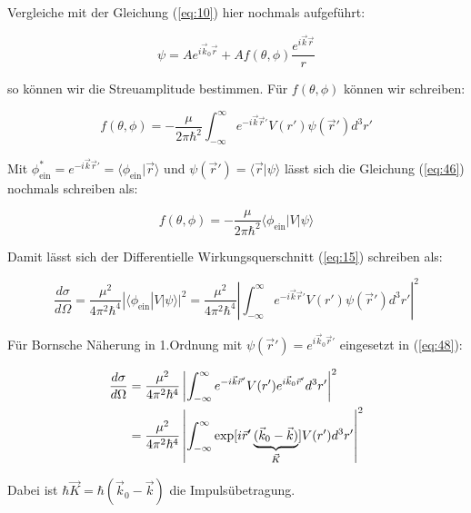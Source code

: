 Vergleiche mit der Gleichung (\ref{eq:10}) hier nochmals aufgeführt:

\begin{equation}
  \label{eq:45}
  \psi = A e^{i\vec k_{0}\vec r} + A f(\theta,\phi)\frac{e^{i\vec k\vec r}}{r} 
\end{equation}


so können wir die Streuamplitude bestimmen. Für \(f(\theta,\phi)\) können wir schreiben:

\begin{equation}
  \label{eq:46}
  \boxed{ f(\theta,\phi) = - \frac{\mu}{2\pi\hbar^2}\int_{-\infty}^\infty e^{- i\vec k\vec r' }  V(r') \psi(\vec r') d^3 r' }
\end{equation}

Mit \(\phi_{\text{ein}}^* =e^{- i\vec k\vec r' } = \langle\phi_{\text{ein}}|\vec r\rangle  \) und \(\psi(\vec r') = \langle \vec r| \psi\rangle \) lässt sich die Gleichung (\ref{eq:46}) nochmals schreiben als:

\begin{equation}
  \label{eq:47}
   \boxed{ f(\theta,\phi) = - \frac{\mu}{2\pi\hbar^2} \langle\phi_{\text{ein}}|  V |\psi\rangle }
\end{equation}


Damit lässt sich der Differentielle Wirkungsquerschnitt (\ref{eq:15})  schreiben als:

\begin{equation}
  \label{eq:48}
  \boxed{  \frac{d\sigma}{d\Omega}= \frac{\mu^2}{4\pi^2\hbar^4} |\langle\phi_{\text{ein}}|  V |\psi\rangle |^2 = \frac{\mu^2}{4\pi^2\hbar^4} \left| \int_{-\infty}^\infty e^{- i\vec k\vec r' }  V(r') \psi(\vec r') d^3 r' \right|^2  }
\end{equation}


Für Bornsche Näherung in 1.Ordnung mit \(\psi(\vec r') = e^{i\vec k_0\vec r'}\) eingesetzt in (\ref{eq:48}):

\begin{align}
  \label{eq:49}
  \frac{d\sigma}{d\Omega} &=  \frac{\mu^2}{4\pi^2\hbar^4} \left| \int_{-\infty}^\infty e^{- i\vec k\vec r' }  V(r')  e^{i\vec k_0\vec r'} d^3 r' \right|^2 \notag\\
&=  \frac{\mu^2}{4\pi^2\hbar^4} \left| \int_{-\infty}^\infty \exp[i\vec r'\underbrace{(\vec k_0 -\vec k)}_{\vec K} ]  V(r')  d^3 r' \right|^2 
\end{align}

Dabei ist \(\hbar \vec K = \hbar (\vec k_0 - \vec k)\) die Impulsübetragung. 

